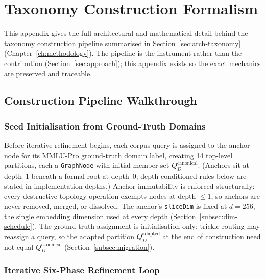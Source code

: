 \chapter{Taxonomy Construction Formalism}\label{app:dag-formalism}\label{sec:meth-construction-summary}

This appendix gives the full architectural and mathematical detail behind the taxonomy
construction pipeline summarised in Section~\ref{sec:arch-taxonomy}
(Chapter~\ref{ch:methodology}).
The pipeline is the instrument rather than the contribution (Section~\ref{sec:approach});
this appendix exists so the exact mechanics are preserved and traceable.

\section{Construction Pipeline Walkthrough}\label{sec:app-dag-pipeline}

\subsection{Seed Initialisation from Ground-Truth Domains}

Before iterative refinement begins, each corpus query is assigned to the anchor node for
its MMLU-Pro ground-truth domain label, creating 14 top-level partitions, each a
\texttt{GraphNode} with initial member set $Q_D^{\text{canonical}}$.
(Anchors sit at depth~1 beneath a formal root at depth~0; depth-conditioned rules below
are stated in implementation depths.)
Anchor immutability is enforced structurally: every destructive topology operation
exempts nodes at depth $\leq 1$, so anchors are never removed, merged, or dissolved.
The anchor's \texttt{sliceDim} is fixed at $d = 256$, the single embedding dimension used
at every depth (Section~\ref{subsec:dim-schedule}).
The ground-truth assignment is initialisation only: trickle routing may reassign a
query, so the adapted partition $Q_D^{\text{adapted}}$ at the end of construction need
not equal $Q_D^{\text{canonical}}$ (Section~\ref{subsec:migration}).

\subsection{Iterative Six-Phase Refinement Loop}\label{tab:pipeline}

